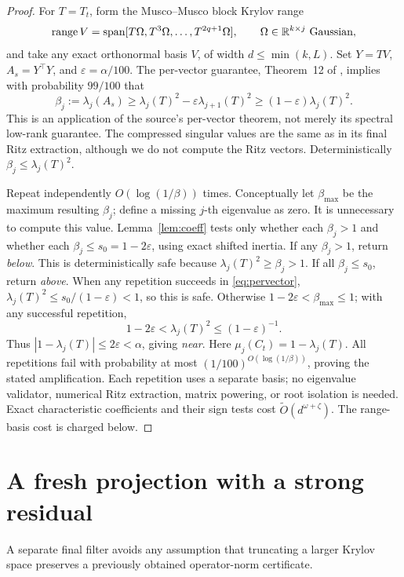 \documentclass[11pt]{article}
\newcommand{\R}{\mathbb R}
\newcommand{\range}{\operatorname{range}}
\newcommand{\tO}{\widetilde O}
\begin{document}
\begin{proof}
For \(T=T_t\), form the Musco--Musco block Krylov range
\[
 \range V=\operatorname{span}[T\Omega,T^3\Omega,\ldots,T^{2q+1}\Omega],
 \qquad \Omega\in\R^{k\times j}\ \hbox{Gaussian},
\]
and take any exact orthonormal basis \(V\), of width \(d\leq\min(k,L)\).
Set \(Y=TV\), \(A_s=Y^\top Y\), and \(\varepsilon=\alpha/100\).
The per-vector guarantee, Theorem~12 of \cite{mm}, implies with
probability \(99/100\) that
\begin{equation}\label{eq:pervector}
 \beta_j:=\lambda_j(A_s)
 \geq\lambda_j(T)^2-\varepsilon\lambda_{j+1}(T)^2
 \geq(1-\varepsilon)\lambda_j(T)^2.
\end{equation}
This is an application of the source's per-vector theorem, not merely
its spectral low-rank guarantee. The compressed singular values are
the same as in its final Ritz extraction, although we do not compute
the Ritz vectors. Deterministically \(\beta_j\leq\lambda_j(T)^2\).

Repeat independently \(O(\log(1/\beta))\) times. Conceptually let
\(\beta_{\max}\) be the maximum resulting \(\beta_j\); define a missing
\(j\)-th eigenvalue as zero. It is unnecessary to compute this value.
Lemma~\ref{lem:coeff} tests only whether each \(\beta_j>1\) and whether
each \(\beta_j\leq s_0=1-2\varepsilon\), using exact shifted inertia.
If any \(\beta_j>1\), return \emph{below}. This is deterministically
safe because \(\lambda_j(T)^2\geq\beta_j>1\).
If all \(\beta_j\leq s_0\), return \emph{above}. When any repetition
succeeds in \eqref{eq:pervector},
\(\lambda_j(T)^2\leq s_0/(1-\varepsilon)<1\), so this is safe.
Otherwise \(1-2\varepsilon<\beta_{\max}\leq1\); with any successful
repetition,
\[
 1-2\varepsilon<\lambda_j(T)^2\leq(1-\varepsilon)^{-1}.
\]
Thus \(|1-\lambda_j(T)|\leq2\varepsilon<\alpha\), giving \emph{near}.
Here \(\mu_j(C_t)=1-\lambda_j(T)\). All repetitions fail with probability
at most \((1/100)^{O(\log(1/\beta))}\), proving the stated amplification.
Each repetition uses a separate basis; no eigenvalue validator, numerical
Ritz extraction, matrix powering, or root isolation is needed. Exact
characteristic coefficients and their sign tests cost
\(\tO(d^{\omega+\zeta})\). The range-basis cost is charged below.
\end{proof}

\section{A fresh projection with a strong residual}
A separate final filter avoids any assumption that truncating a larger
Krylov space preserves a previously obtained operator-norm certificate.
\end{document}
